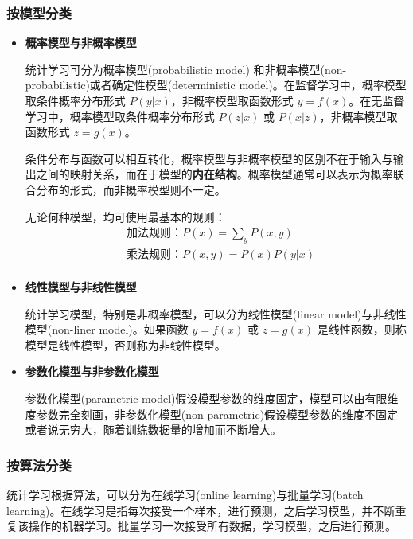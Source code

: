 \subsubsection{按模型分类}
\begin{itemize}
    \item \textbf{概率模型与非概率模型} 
    
    统计学习可分为概率模型(probabilistic model) 和非概率模型(non-probabilistic)或者确定性模型(deterministic model)。在监督学习中，概率模型取条件概率分布形式 $P(y|x)$，非概率模型取函数形式 $y=f(x)$。在无监督学习中，概率模型取条件概率分布形式 $P(z|x)$ 或 $P(x|z)$，非概率模型取函数形式 $z=g(x)$。

    条件分布与函数可以相互转化，概率模型与非概率模型的区别不在于输入与输出之间的映射关系，而在于模型的\textbf{内在结构}。概率模型通常可以表示为概率联合分布的形式，而非概率模型则不一定。

    无论何种模型，均可使用最基本的规则：
    \begin{equation}
        \begin{aligned}
            &\text{加法规则：}P(x)=\underset{y}{\sum}P(x,y) \\
            &\text{乘法规则：}P(x,y)=P(x)P(y|x) \\
        \end{aligned}
    \end{equation}

    \item \textbf{线性模型与非线性模型}
    
    统计学习模型，特别是非概率模型，可以分为线性模型(linear model)与非线性模型(non-liner model)。如果函数 $y=f(x)$ 或 $z=g(x)$ 是线性函数，则称模型是线性模型，否则称为非线性模型。

    \item \textbf{参数化模型与非参数化模型}
    
    参数化模型(parametric model)假设模型参数的维度固定，模型可以由有限维度参数完全刻画，非参数化模型(non-parametric)假设模型参数的维度不固定或者说无穷大，随着训练数据量的增加而不断增大。
\end{itemize}

\subsubsection{按算法分类}
统计学习根据算法，可以分为在线学习(online learning)与批量学习(batch learning)。在线学习是指每次接受一个样本，进行预测，之后学习模型，并不断重复该操作的机器学习。批量学习一次接受所有数据，学习模型，之后进行预测。

